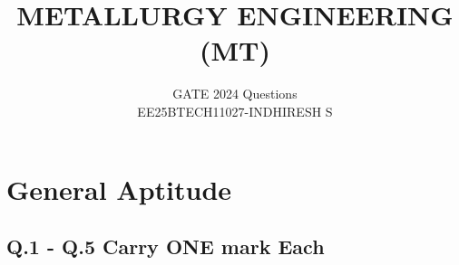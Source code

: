\documentclass[journal]{IEEEtran}
\theoremstyle{remark}
\begin{document}

\onecolumn

\title{METALLURGY ENGINEERING (MT)}
\author{GATE 2024 Questions\\EE25BTECH11027-INDHIRESH S}
\maketitle

\renewcommand{\thefigure}{\theenumi}
\renewcommand{\thetable}{\theenumi}

\section*{General Aptitude}
\subsection*{Q.1 - Q.5 Carry ONE mark Each}
\end{document}
